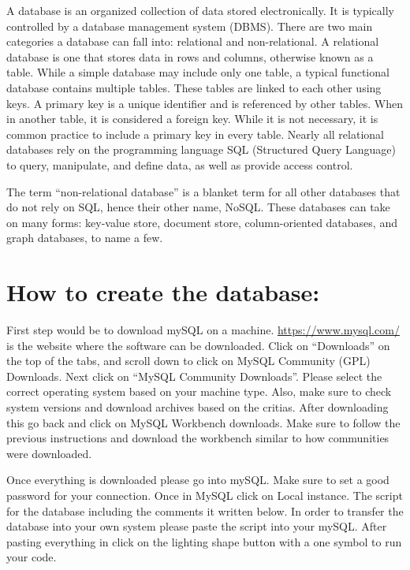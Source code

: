 \documentclass[]{book}
\begin{document}
A database is an organized collection of data stored electronically. It
is typically controlled by a database management system (DBMS). There
are two main categories a database can fall into: relational and
non-relational. A relational database is one that stores data in rows
and columns, otherwise known as a table. While a simple database may
include only one table, a typical functional database contains multiple
tables. These tables are linked to each other using keys. A primary key
is a unique identifier and is referenced by other tables. When in
another table, it is considered a foreign key. While it is not
necessary, it is common practice to include a primary key in every
table. Nearly all relational databases rely on the programming language
SQL (Structured Query Language) to query, manipulate, and define data,
as well as provide access control.

The term ``non-relational database'' is a blanket term for all other
databases that do not rely on SQL, hence their other name, NoSQL. These
databases can take on many forms: key-value store, document store,
column-oriented databases, and graph databases, to name a few.

\section{How to create the database:}\label{how-to-create-the-database}

First step would be to download mySQL on a machine.
\url{https://www.mysql.com/} is the website where the software can be
downloaded. Click on ``Downloads'' on the top of the tabs, and scroll
down to click on MySQL Community (GPL) Downloads. Next click on ``MySQL
Community Downloads''. Please select the correct operating system based
on your machine type. Also, make sure to check system versions and
download archives based on the critias. After downloading this go back
and click on MySQL Workbench downloads. Make sure to follow the previous
instructions and download the workbench similar to how communities were
downloaded.

Once everything is downloaded please go into mySQL. Make sure to set a
good password for your connection. Once in MySQL click on Local
instance. The script for the database including the comments it written
below. In order to transfer the database into your own system please
paste the script into your mySQL. After pasting everything in click on
the lighting shape button with a one symbol to run your code.
\end{document}
